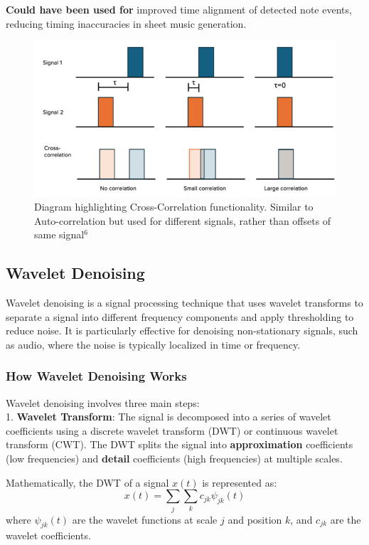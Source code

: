 \documentclass{article}
\begin{document}
\textbf{Could have been used for} improved time alignment of detected note events, reducing timing inaccuracies in sheet music generation.

\begin{figure}[h]
\includegraphics[width=125mm,scale=0.5]{docs/LiteratureReview/images/cross-correlation-example.png}
\caption{Diagram highlighting Cross-Correlation functionality. Similar to Auto-correlation but used for different signals, rather than offsets of same signal$^6$}
\end{figure}

\newpage

\subsection{Wavelet Denoising}
Wavelet denoising is a signal processing technique that uses wavelet transforms to separate a signal into different frequency components and apply thresholding to reduce noise. It is particularly effective for denoising non-stationary signals, such as audio, where the noise is typically localized in time or frequency.

\subsubsection{How Wavelet Denoising Works}
Wavelet denoising involves three main steps:  \\

1. \textbf{Wavelet Transform}: The signal is decomposed into a series of wavelet coefficients using a discrete wavelet transform (DWT) or continuous wavelet transform (CWT). The DWT splits the signal into \textbf{approximation} coefficients (low frequencies) and \textbf{detail} coefficients (high frequencies) at multiple scales.
   
   Mathematically, the DWT of a signal \( x(t) \) is represented as:
   \[
   x(t) = \sum_{j} \sum_{k} c_{jk} \psi_{jk}(t)
   \]
   where \( \psi_{jk}(t) \) are the wavelet functions at scale \( j \) and position \( k \), and \( c_{jk} \) are the wavelet coefficients. \\
\end{document}
